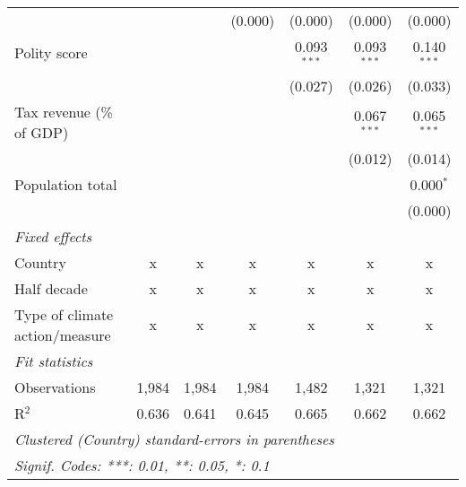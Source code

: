 \begin{tabular}{lcccccc}
                                                                                  &         &                & (0.000)        & (0.000)        & (0.000)        & (0.000)\\   
   Polity score                                                                   &         &                &                & 0.093$^{***}$  & 0.093$^{***}$  & 0.140$^{***}$\\   
                                                                                  &         &                &                & (0.027)        & (0.026)        & (0.033)\\   
   Tax revenue (\% of GDP)                                                        &         &                &                &                & 0.067$^{***}$  & 0.065$^{***}$\\   
                                                                                  &         &                &                &                & (0.012)        & (0.014)\\   
   Population total                                                               &         &                &                &                &                & 0.000$^{*}$\\   
                                                                                  &         &                &                &                &                & (0.000)\\   
   \emph{Fixed effects}\\
   Country                                                                        & x       & x              & x              & x              & x              & x\\  
   Half decade                                                                    & x       & x              & x              & x              & x              & x\\  
   Type of climate action/measure                                                 & x       & x              & x              & x              & x              & x\\  
   \midrule \emph{Fit statistics}\\
   Observations                                                                   & 1,984   & 1,984          & 1,984          & 1,482          & 1,321          & 1,321\\  
   R$^2$                                                                          & 0.636   & 0.641          & 0.645          & 0.665          & 0.662          & 0.662\\  
   \midrule
   \multicolumn{7}{l}{\emph{Clustered (Country) standard-errors in parentheses}}\\
   \multicolumn{7}{l}{\emph{Signif. Codes: ***: 0.01, **: 0.05, *: 0.1}}\\
\end{tabular}
\par\endgroup


